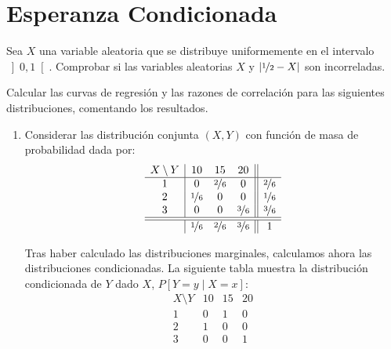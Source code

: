 \section{Esperanza Condicionada}

\begin{ejercicio}
    Sea $X$ una variable aleatoria que se distribuye uniformemente en el intervalo $\left]0,1\right[$. Comprobar si las variables aleatorias $X$ y $|\nicefrac{1}{2}-X|$ son incorreladas.

\end{ejercicio}

\begin{ejercicio}
    Calcular las curvas de regresión y las razones de correlación para las siguientes distribuciones, comentando los resultados.
    \begin{enumerate}
        \item Considerar las distribución conjunta $(X,Y)$ con función de masa de probabilidad dada por:
        \begin{equation*}
            \begin{array}{c|ccc||c}
                X\setminus Y & 10 & 15 & 20 & \\
                \hline
                1 & 0 & \nicefrac{2}{6} & 0 & \nicefrac{2}{6}\\
                2 & \nicefrac{1}{6} & 0 & 0 & \nicefrac{1}{6}\\
                3 & 0 & 0 & \nicefrac{3}{6} & \nicefrac{3}{6}\\
                \hline \hline
                & \nicefrac{1}{6} & \nicefrac{2}{6} & \nicefrac{3}{6} & 1
            \end{array}
        \end{equation*}

        Tras haber calculado las distribuciones marginales, calculamos ahora las distribuciones condicionadas.
        La siguiente tabla muestra la distribución condicionada de $Y$ dado $X$, $P[Y = y\mid X = x]$:
        \begin{equation*}
            \begin{array}{c|ccc}
                X\setminus Y & 10 & 15 & 20 \\
                \hline
                1 & 0 & 1 & 0\\
                2 & 1 & 0 & 0\\
                3 & 0 & 0 & 1
            \end{array}
        \end{equation*}


\end{enumerate}
\end{ejercicio}
